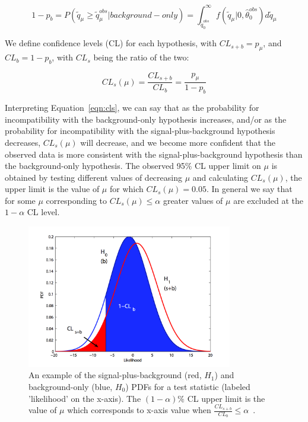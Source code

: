 \begin{equation}
\label{eqn:pvalues2}
1- p_{b} = P(\tilde{q}_{\mu} \geq \tilde{q}_{\mu}^{obs}|background-only) = \int_{\tilde{q}_{0}^{obs}}^{\infty} f(\tilde{q}_{\mu}|0,\hat{\theta}_{0}^{obs}) d\tilde{q}_{\mu}
\end{equation}

\noindent We define confidence levels (CL) for each hypothesis, with $CL_{s+b} = p_{\mu}$, and $CL_{b} = 1-p_{b}$, with $CL_{s}$ being the ratio of the two:

\begin{equation}
\label{eqn:cls}
CL_{s}(\mu) = \frac{CL_{s+b}}{CL_{b}} = \frac{p_{\mu}}{1-p_{b}}
\end{equation}

\noindent Interpreting Equation~\ref{eqn:cls}, we can say that as the probability for incompatibility with the background-only hypothesis increases, and/or as the probability
for incompatibility with the signal-plus-background hypothesis decreases, $CL_{s}(\mu)$ will decrease, and we become more confident that the observed data is more consistent with
the signal-plus-background hypothesis than the background-only hypothesis. The observed 95$\%$ CL upper limit on $\mu$ is obtained by testing different values of decreasing $\mu$ and
calculating $CL_{s}(\mu)$, the upper limit is the value of $\mu$ for which $CL_{s}(\mu) = 0.05$. In general we say that for some $\mu$ corresponding to $CL_{s}(\mu) \leq \alpha$
greater values of $\mu$ are excluded at the $1-\alpha$ CL level. 

\begin{figure}[htb]
        \centering 
        \includegraphics[width=0.80\textwidth]{ch11_figs/cls.pdf}
        \caption[Test statistic PDFs for s+b and b-only hypotheses]{An example of the signal-plus-background (red, $H_{1}$) and background-only (blue, $H_{0}$) PDFs for a
          test statistic (labeled 'likelihood' on the x-axis). The $(1-\alpha)\%$ CL upper limit is the value of $\mu$ which corresponds to x-axis value
          when $\frac{CL_{s+b}}{CL_{b}} \leq \alpha$~\cite{lhc4peds}.}
        \label{fig:cls}
\end{figure}

